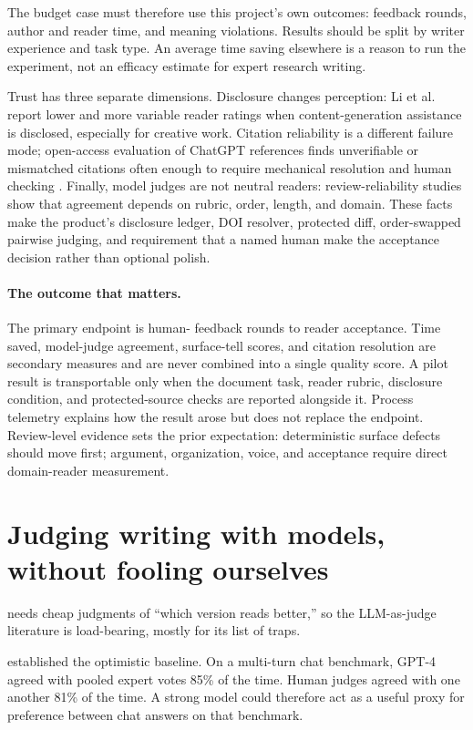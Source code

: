 The budget case must therefore use this project's own outcomes: feedback
rounds, author and reader time, and meaning violations. Results should be split
by writer experience and task type. An average time saving elsewhere is a
reason to run the experiment, not an efficacy estimate for expert research
writing.

Trust has three separate dimensions. Disclosure changes perception: Li et al.
\citep{li2024disclosure} report lower and more variable reader ratings when
content-generation assistance is disclosed, especially for creative work.
Citation reliability is a different failure mode; open-access evaluation of
ChatGPT references finds unverifiable or mismatched citations often enough to
require mechanical resolution and human checking \citep{mugaanyi2024citation}.
Finally, model judges are not neutral readers: review-reliability studies show
that agreement depends on rubric, order, length, and domain. These facts make
the product's disclosure ledger, DOI resolver, protected diff, order-swapped
pairwise judging, and requirement that a named human make the acceptance
decision rather than optional polish.

\paragraph{The outcome that matters.} The primary endpoint is human-
feedback rounds to reader acceptance. Time saved, model-judge agreement,
surface-tell scores, and citation resolution are secondary measures and are
never combined into a single quality score. A pilot result is transportable
only when the document task, reader rubric, disclosure condition, and
protected-source checks are reported alongside it. Process telemetry explains
how the result arose but does not replace the endpoint. Review-level evidence
sets the prior expectation: deterministic surface defects should move first;
argument, organization, voice, and acceptance require direct domain-reader
measurement.

\section{Judging writing with models, without fooling ourselves}
\label{sec:lit-judging}

\hv{} needs cheap judgments of ``which version reads better,'' so the
LLM-as-judge literature is load-bearing, mostly for its list of traps.

\citet{zheng2023judging} established the optimistic baseline. On a multi-turn
chat benchmark, GPT-4 agreed with pooled expert votes 85\% of the time. Human
judges agreed with one another 81\% of the time. A strong model could therefore
act as a useful proxy for preference between chat answers on that benchmark.

